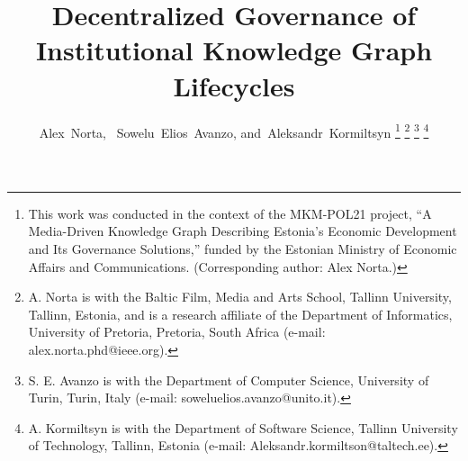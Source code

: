 \documentclass[journal]{IEEEtran}
\begin{document}
%
\title{Decentralized Governance of Institutional Knowledge Graph Lifecycles}
%
%
%

\author{Alex~Norta,~
        Sowelu~Elios~Avanzo,
        and~Aleksandr~Kormiltsyn%
\thanks{This work was conducted in the context of the MKM-POL21 project,
``A Media-Driven Knowledge Graph Describing Estonia's Economic Development
and Its Governance Solutions,'' funded by the Estonian Ministry of Economic
Affairs and Communications. (Corresponding author: Alex Norta.)}%
\thanks{A. Norta is with the Baltic Film, Media and Arts School, Tallinn
University, Tallinn, Estonia, and is a research affiliate of the Department
of Informatics, University of Pretoria, Pretoria, South Africa (e-mail:
alex.norta.phd@ieee.org).}%
\thanks{S. E. Avanzo is with the Department of Computer Science, University
of Turin, Turin, Italy (e-mail: soweluelios.avanzo@unito.it).}%
\thanks{A. Kormiltsyn is with the Department of Software Science, Tallinn
University of Technology, Tallinn, Estonia (e-mail:
Aleksandr.kormiltson@taltech.ee).}}

% 
%
\end{document}
